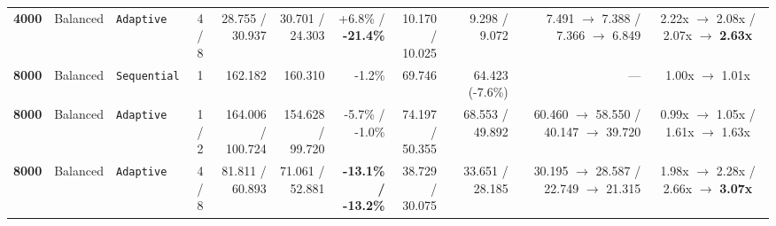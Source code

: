 \documentclass[11pt,a4paper]{article}
\renewcommand{\_}{\textunderscore\allowbreak}
\begin{document}
\begin{table}[H]
{\begin{tabular}{r l l c r r r r r r c}
\textbf{4000} & Balanced & \texttt{Adaptive} & 4 / 8 & \makecell[r]{28.755 /\\ 30.937} & \makecell[r]{30.701 /\\ 24.303} & \makecell[r]{+6.8\% /\\ \textbf{-21.4\%}} & \makecell[r]{10.170 /\\ 10.025} & \makecell[r]{9.298 /\\ 9.072} & \makecell[r]{7.491 $\to$ 7.388 /\\ 7.366 $\to$ 6.849} & \makecell[c]{2.22x $\to$ 2.08x /\\ 2.07x $\to$ \textbf{2.63x}} \\
\textbf{8000} & Balanced & \texttt{Sequential} & 1 & 162.182 & 160.310 & -1.2\% & 69.746 & 64.423 (-7.6\%) & --- & 1.00x $\to$ 1.01x \\
\textbf{8000} & Balanced & \texttt{Adaptive} & 1 / 2 & \makecell[r]{164.006 /\\ 100.724} & \makecell[r]{154.628 /\\ 99.720} & \makecell[r]{-5.7\% /\\ -1.0\%} & \makecell[r]{74.197 /\\ 50.355} & \makecell[r]{68.553 /\\ 49.892} & \makecell[r]{60.460 $\to$ 58.550 /\\ 40.147 $\to$ 39.720} & \makecell[c]{0.99x $\to$ 1.05x /\\ 1.61x $\to$ 1.63x} \\
\textbf{8000} & Balanced & \texttt{Adaptive} & 4 / 8 & \makecell[r]{81.811 /\\ 60.893} & \makecell[r]{71.061 /\\ 52.881} & \makecell[r]{\textbf{-13.1\% /}\\ \textbf{-13.2\%}} & \makecell[r]{38.729 /\\ 30.075} & \makecell[r]{33.651 /\\ 28.185} & \makecell[r]{30.195 $\to$ 28.587 /\\ 22.749 $\to$ 21.315} & \makecell[c]{1.98x $\to$ 2.28x /\\ 2.66x $\to$ \textbf{3.07x}} \\
\bottomrule
\end{tabular}%
}
\end{table}
\end{document}
